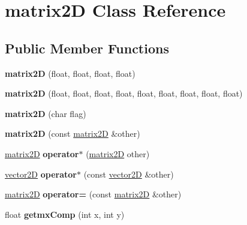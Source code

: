 \hypertarget{classmatrix2_d}{}\section{matrix2D Class Reference}
\label{classmatrix2_d}
\subsection*{Public Member Functions}
\begin{DoxyCompactItemize}
\item 
\mbox{\label{classmatrix2_d_aa7b81c817478bc3fddfae65ee6ff065f}} 
{\bfseries matrix2D} (float, float, float, float)
\item 
\mbox{\label{classmatrix2_d_a927b0715429dab1062c24e1c6f2bff5a}} 
{\bfseries matrix2D} (float, float, float, float, float, float, float, float, float)
\item 
\mbox{\label{classmatrix2_d_a08785f892d2825ae23bf3f69129f29e9}} 
{\bfseries matrix2D} (char flag)
\item 
\mbox{\label{classmatrix2_d_afb388ed858aa825548e535261dc932da}} 
{\bfseries matrix2D} (const \hyperlink{classmatrix2_d}{matrix2D} \&other)
\item 
\mbox{\label{classmatrix2_d_a280334e1dd70724d37066db8be648cee}} 
\hyperlink{classmatrix2_d}{matrix2D} {\bfseries operator$\ast$} (\hyperlink{classmatrix2_d}{matrix2D} other)
\item 
\mbox{\label{classmatrix2_d_ad084db59ae4b4c105df16f420dea2a14}} 
\hyperlink{classvector2_d}{vector2D} {\bfseries operator$\ast$} (const \hyperlink{classvector2_d}{vector2D} \&other)
\item 
\mbox{\label{classmatrix2_d_a24d13f2654f09e15023a7bb3a22952ae}} 
\hyperlink{classmatrix2_d}{matrix2D} {\bfseries operator=} (const \hyperlink{classmatrix2_d}{matrix2D} \&other)
\item 
\mbox{\label{classmatrix2_d_afefef82279b596bca0782fdfc8a5037f}} 
float {\bfseries getmx\+Comp} (int x, int y)
\item 

\end{DoxyCompactItemize}
